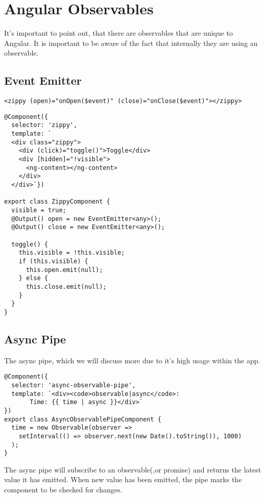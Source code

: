 \maketitle{}
\section{ Angular Observables }
It's important to point out, that there are observables that are unique to 
Angular. It is important to be aware of the fact that internally they are 
using an observable. 

\subsection{ Event Emitter }

\begin{lstlisting}
<zippy (open)="onOpen($event)" (close)="onClose($event)"></zippy>
\end{lstlisting}

\begin{lstlisting}
@Component({
  selector: 'zippy',
  template: `
  <div class="zippy">
    <div (click)="toggle()">Toggle</div>
    <div [hidden]="!visible">
      <ng-content></ng-content>
    </div>
  </div>`})

export class ZippyComponent {
  visible = true;
  @Output() open = new EventEmitter<any>();
  @Output() close = new EventEmitter<any>();

  toggle() {
    this.visible = !this.visible;
    if (this.visible) {
      this.open.emit(null);
    } else {
      this.close.emit(null);
    }
  }
}
\end{lstlisting}

\subsection{ Async Pipe }
The async pipe, which we will discuss more due to it's high usage within the
app. 

\begin{lstlisting}
@Component({
  selector: 'async-observable-pipe',
  template: `<div><code>observable|async</code>:
       Time: {{ time | async }}</div>`
})
export class AsyncObservablePipeComponent {
  time = new Observable(observer =>
    setInterval(() => observer.next(new Date().toString()), 1000)
  );
}
\end{lstlisting}

The async pipe will subscribe to an observable(,or promise) and returns the 
latest value it has emitted. When new value has been emitted, the pipe marks 
the component to be checked for changes. 
